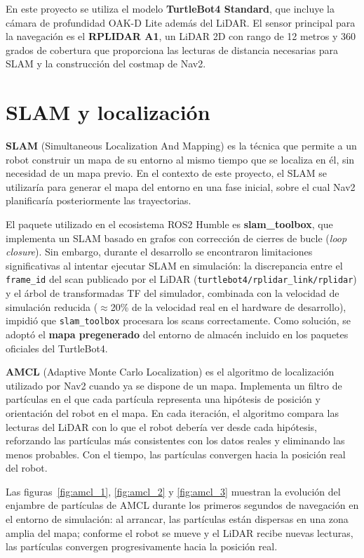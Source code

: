 En este proyecto se utiliza el modelo \textbf{TurtleBot4 Standard}, que incluye la cámara de profundidad OAK-D Lite además del LiDAR. El sensor principal para la navegación es el \textbf{RPLIDAR A1}, un LiDAR 2D con rango de 12 metros y 360 grados de cobertura que proporciona las lecturas de distancia necesarias para SLAM y la construcción del costmap de Nav2.

\section{SLAM y localización}

\textbf{SLAM} (Simultaneous Localization And Mapping)\cite{durrant2006slam} es la técnica que permite a un robot construir un mapa de su entorno al mismo tiempo que se localiza en él, sin necesidad de un mapa previo. En el contexto de este proyecto, el SLAM se utilizaría para generar el mapa del entorno en una fase inicial, sobre el cual Nav2 planificaría posteriormente las trayectorias.

El paquete utilizado en el ecosistema ROS2 Humble es \textbf{slam\_toolbox}\cite{slam_toolbox}, que implementa un SLAM basado en grafos con corrección de cierres de bucle (\textit{loop closure}). Sin embargo, durante el desarrollo se encontraron limitaciones significativas al intentar ejecutar SLAM en simulación: la discrepancia entre el \texttt{frame\_id} del scan publicado por el LiDAR (\texttt{turtlebot4/rplidar\_link/rplidar}) y el árbol de transformadas TF del simulador, combinada con la velocidad de simulación reducida ($\approx$20\% de la velocidad real en el hardware de desarrollo), impidió que \texttt{slam\_toolbox} procesara los scans correctamente. Como solución, se adoptó el \textbf{mapa pregenerado} del entorno de almacén incluido en los paquetes oficiales del TurtleBot4.

\textbf{AMCL} (Adaptive Monte Carlo Localization)\cite{fox1999amcl} es el algoritmo de localización utilizado por Nav2 cuando ya se dispone de un mapa. Implementa un filtro de partículas en el que cada partícula representa una hipótesis de posición y orientación del robot en el mapa. En cada iteración, el algoritmo compara las lecturas del LiDAR con lo que el robot debería ver desde cada hipótesis, reforzando las partículas más consistentes con los datos reales y eliminando las menos probables. Con el tiempo, las partículas convergen hacia la posición real del robot.

Las figuras~\ref{fig:amcl_1}, \ref{fig:amcl_2} y \ref{fig:amcl_3} muestran la evolución del enjambre de partículas de AMCL durante los primeros segundos de navegación en el entorno de simulación: al arrancar, las partículas están dispersas en una zona amplia del mapa; conforme el robot se mueve y el LiDAR recibe nuevas lecturas, las partículas convergen progresivamente hacia la posición real.

